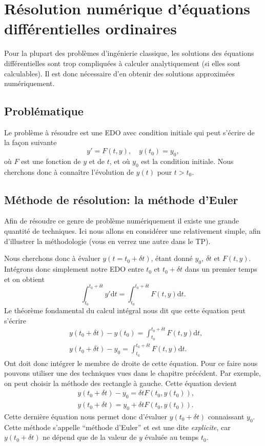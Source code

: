 \documentclass[a4paper,12pt]{book}
\newcommand{\dd}{\mathrm{d}}
\begin{document}
\section{Résolution numérique d'équations différentielles ordinaires}

Pour la plupart des problèmes d'ingénierie classique, les solutions des équations différentielles 
sont trop compliquées à calculer analytiquement (si elles sont calculables). Il est donc nécessaire d'en obtenir des solutions
approximées numériquement. 

\subsection{Problématique}

Le problème à résoudre est une EDO avec condition initiale qui peut s'écrire de la façon suivante
\begin{equation}
 y'=F(t,y),\quad y(t_0)=y_0,
\end{equation}
où $F$ est une fonction de $y$ et de $t$, et où $y_0$ est la condition initiale. Nous cherchons donc à connaître
l'évolution de $y(t)$ pour $t>t_0$.

\subsection{Méthode de résolution: la méthode d'Euler}

Afin de résoudre ce genre de problème numériquement il existe une grande quantité de techniques.
Ici nous allons en considérer une relativement simple, afin d'illustrer 
la méthodologie (vous en verrez une autre dans le TP). 

Nous cherchons donc à évaluer $y(t=t_0+\delta t)$, étant donné $y_0$, $\delta t$ et $F(t,y)$. Intégrons donc simplement
notre EDO entre $t_0$ et $t_0+\delta t$ dans un premier temps et on obtient
\begin{equation}
 \int_{t_0}^{t_0+\delta t} y' \dd t=\int_{t_0}^{t_0+\delta t} F(t,y)\dd t.
\end{equation}
Le théorème fondamental du calcul intégral nous dit que cette équation peut s'écrire
\begin{align}
 &y(t_0+\delta t)-y(t_0)=\int_{t_0}^{t_0+\delta t} F(t,y)\dd t,\nonumber\\
 &y(t_0+\delta t)-y_0=\int_{t_0}^{t_0+\delta t} F(t,y)\dd t.\label{eq_edo_app_gen}
\end{align}
Ont doit donc intégrer le membre de droite de cette équation. Pour ce faire nous pouvons utiliser 
une des techniques vues dans le chapitre précédent. Par exemple, on peut choisir la méthode des rectangle à gauche.
Cette équation devient
\begin{align}
 &y(t_0+\delta t)-y_0=\delta t F(t_0,y(t_0)),\nonumber\\
 &y(t_0+\delta t)=y_0+\delta t F(t_0,y(t_0)).
\end{align}
Cette dernière équation nous permet donc d'évaluer $y(t_0+\delta t)$ connaissant $y_0$. Cette méthode s'appelle ``méthode d'Euler'' 
et est une dite \textit{explicite}, car $y(t_0+\delta t)$ ne dépend que de la valeur de $y$ évaluée au temps $t_0$. 
\end{document}

